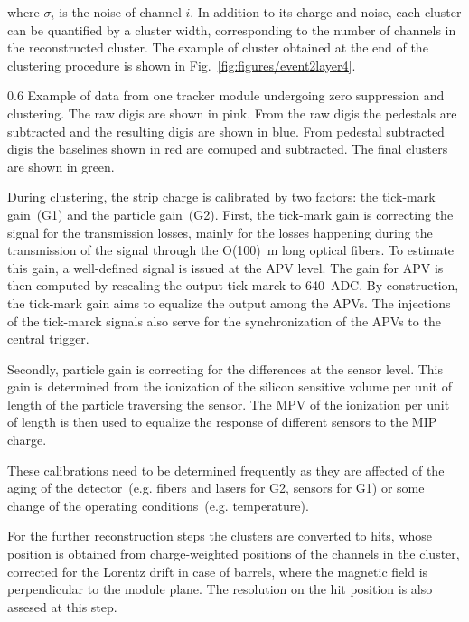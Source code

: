where $\sigma_{i}$ is the noise of channel $i$. In addition to its charge and noise, each cluster can be quantified by a cluster width, corresponding to the number of channels in the reconstructed cluster. The example of cluster obtained at the end of the clustering procedure is shown in Fig.~\ref{fig:figures/event2layer4}.

                 {0.6}       %
                 {Example of data from one tracker module undergoing zero suppression and clustering. The raw digis are shown in pink. From the raw digis the pedestals are subtracted and the resulting digis are shown in blue. From pedestal subtracted digis the baselines shown in red are comuped and subtracted. The final clusters are shown in green.} %


During clustering, the strip charge is calibrated by two factors: the tick-mark gain~(G1) and the particle gain~(G2). First, the tick-mark gain is correcting the signal for the transmission losses, mainly for the losses happening during the transmission of the signal through the O(100)~m long optical fibers. To estimate this gain, a well-defined signal is issued at the APV level. The gain for APV is then computed by rescaling the output tick-marck to 640~ADC. By construction, the tick-mark gain aims to equalize the output among the APVs. The injections of the tick-marck signals also serve for the synchronization of the APVs to the central trigger.

Secondly, particle gain is correcting for the differences at the sensor level. This gain is determined from the ionization of the silicon sensitive volume per unit of length of the particle traversing the sensor. The MPV of the ionization per unit of length is then used to equalize the response of different sensors to the MIP charge. 

These calibrations need to be determined frequently as they are affected of the aging of the detector~(e.g. fibers and lasers for G2,  sensors for G1) or some change of the operating conditions~(e.g. temperature).

For the further reconstruction steps the clusters are converted to hits, whose position is obtained from charge-weighted positions of the channels in the cluster, corrected for the Lorentz drift in case of barrels, where the magnetic field is perpendicular to the module plane. The resolution on the hit position is also assesed at this step.

